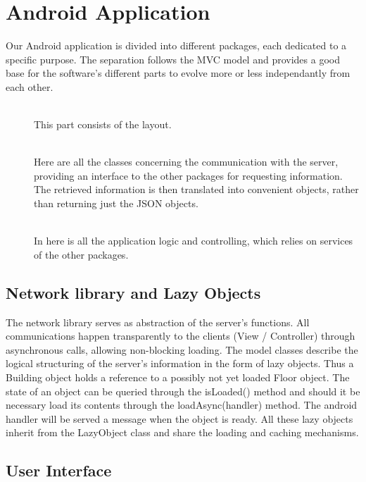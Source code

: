 \section{Android Application}
Our Android application is divided into different packages, each dedicated to a specific purpose. The separation follows the MVC model and provides a good base for the software's different parts to evolve more or less independantly from each other.

\begin{description}
	\item[]\hfill\\This part consists of the layout.
	\item[]\hfill\\Here are all the classes concerning the communication with the server, providing an interface to the other packages for requesting information. The retrieved information is then translated into convenient objects, rather than returning just the JSON objects.
	\item[]\hfill\\In here is all the application logic and controlling, which relies on services of the other packages.
\end{description}

\subsection{Network library and Lazy Objects}
The network library serves as abstraction of the server's functions. All communications happen transparently to the clients (View / Controller) through asynchronous calls, allowing non-blocking loading. The model classes describe the logical structuring of the server's information in the form of lazy objects. Thus a Building object holds a reference to a possibly not yet loaded Floor object. The state of an object can be queried through the isLoaded() method and should it be necessary load its contents through the loadAsync(handler) method. The android handler will be served a message when the object is ready. All these lazy objects inherit from the LazyObject class and share the loading and caching mechanisms.

\subsection{User Interface}

